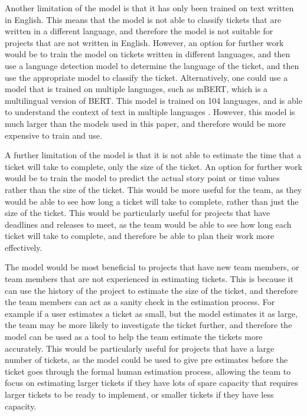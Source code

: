 \documentclass{UoYCSproject}
\begin{document}
    Another limitation of the model is that it has only been trained on text written in English. This means that the model is not able to classify tickets that are written in a different language, and therefore the model is not suitable for projects that are not written in English.
    However, an option for further work would be to train the model on tickets written in different languages, and then use a language detection model to determine the language of the ticket, and then use the appropriate model to classify the ticket. Alternatively, one could use a model that is trained on multiple languages, such as mBERT, which is a multilingual version of BERT. This model is trained on 104 languages, and is able to understand the context of text in multiple languages \cite{devlin2018bert}. However, this model is much larger than the models used in this paper, and therefore would be more expensive to train and use.

    A further limitation of the model is that it is not able to estimate the time that a ticket will take to complete, only the size of the ticket. An option for further work would be to train the model to predict the actual story point or time values rather than the size of the ticket. This would be more useful for the team, as they would be able to see how long a ticket will take to complete, rather than just the size of the ticket. This would be particularly useful for projects that have deadlines and releases to meet, as the team would be able to see how long each ticket will take to complete, and therefore be able to plan their work more effectively.

    The model would be most beneficial to projects that have new team members, or team members that are not experienced in estimating tickets. This is because it can use the history of the project to estimate the size of the ticket, and therefore the team members can act as a sanity check in the estimation process. For example if a user estimates a ticket as small, but the model estimates it as large, the team may be more likely to investigate the ticket further, and therefore the model can be used as a tool to help the team estimate the tickets more accurately. This would be particularly useful for projects that have a large number of tickets, as the model could be used to give pre estimates before the ticket goes through the formal human estimation process, allowing the team to focus on estimating larger tickets if they have lots of spare capacity that requires larger tickets to be ready to implement, or smaller tickets if they have less capacity.










\printbibliography
\end{document}
